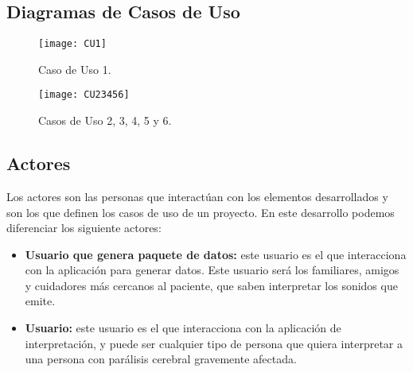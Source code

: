\subsection{Diagramas de Casos de Uso}
\begin{figure}[H]
	\centering
	\texttt{[image: CU1]}
	\caption{Caso de Uso 1.}
	\label{fig:cu1}
\end{figure}

\begin{figure}[H]
	\centering
	\texttt{[image: CU23456]}
	\caption{Casos de Uso 2, 3, 4, 5 y 6.}
	\label{fig:cu}
\end{figure}

\subsection{Actores}
Los actores son las personas que interactúan con los elementos desarrollados y son los que definen los casos de uso de un proyecto. En este desarrollo podemos diferenciar los siguiente actores:
\begin{itemize}
	\item \textbf{Usuario que genera paquete de datos:} este usuario es el que interacciona con la aplicación para generar datos. Este usuario será los familiares, amigos y cuidadores más cercanos al paciente, que saben interpretar los sonidos que emite.
	\item \textbf{Usuario:} este usuario es el que interacciona con la aplicación de interpretación, y puede ser cualquier tipo de persona que quiera interpretar a una persona con parálisis cerebral gravemente afectada.
\end{itemize}
